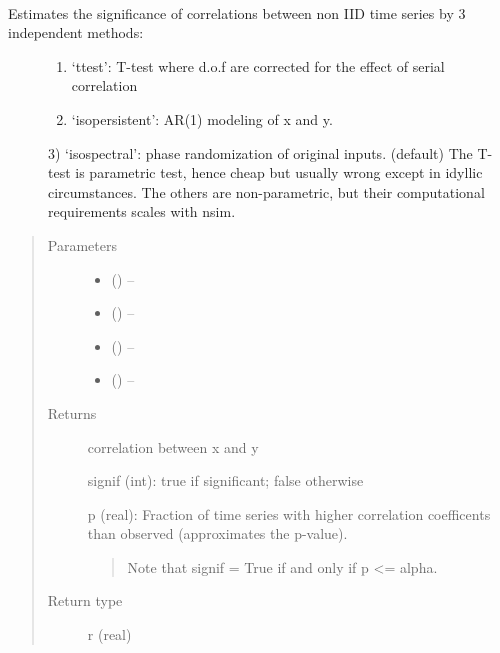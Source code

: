 \documentclass[letterpaper,10pt,english]{sphinxmanual}
\begin{document}
\begin{fulllineitems}
\label{\detokenize{Stats:pyleoclim.Stats.corrsig}}~\begin{description}
\item[{Estimates the significance of correlations between non IID time series by 3 independent methods:}] \leavevmode\begin{enumerate}
\item {} 
`ttest': T-test where d.o.f are corrected for the effect of serial correlation

\item {} 
`isopersistent': AR(1) modeling of x and y.

\end{enumerate}

3) `isospectral': phase randomization of original inputs. (default)
The T-test is parametric test, hence cheap but usually wrong except in idyllic circumstances.
The others are non-parametric, but their computational requirements scales with nsim.

\end{description}
\begin{quote}\begin{description}
\item[{Parameters}] \leavevmode\begin{itemize}
\item {} 
 (\sphinxstyleliteralemphasis{,}\sphinxstyleliteralemphasis{}) -- 

\item {} 
 () -- 

\item {} 
 () -- 

\item {} 
 () -- 

\end{itemize}

\item[{Returns}] \leavevmode

correlation between x and y

signif (int): true  if significant; false otherwise

p (real): Fraction of time series with higher correlation coefficents than observed (approximates the p-value).
\begin{quote}

Note that signif = True if and only if p \textless{}= alpha.
\end{quote}


\item[{Return type}] \leavevmode
r (real)

\end{description}\end{quote}

\end{fulllineitems}
\end{document}
